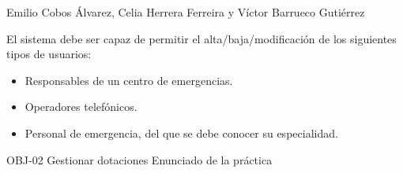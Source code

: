 {Emilio Cobos Álvarez, Celia Herrera Ferreira y Víctor Barrueco Gutiérrez}
{El sistema debe ser capaz de permitir el alta/baja/modificación de los siguientes tipos de usuarios: \par
\begin{itemize}[noitemsep, nolistsep]
    \item Responsables de un centro de emergencias.
    \item Operadores telefónicos.
    \item Personal de emergencia, del que se debe conocer su especialidad.
\end{itemize}}
{OBJ-02 Gestionar dotaciones}
{Enunciado de la práctica}

